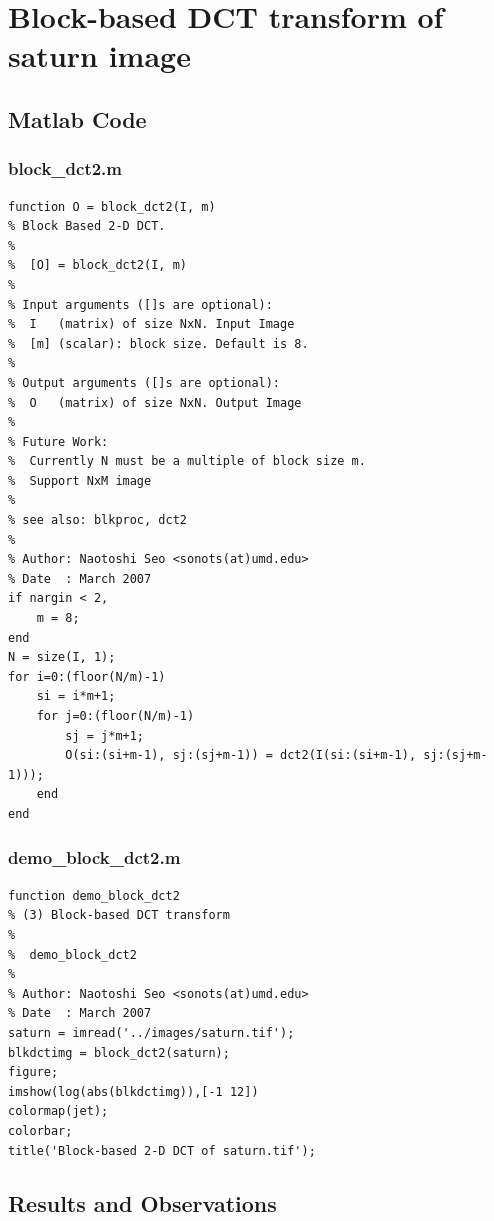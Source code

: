 \documentclass[12pt]{article}
\begin{document}
\section{Block-based DCT transform of saturn image}

\subsection{Matlab Code}

\subsubsection{block\_dct2.m}

\begin{verbatim}
function O = block_dct2(I, m)
% Block Based 2-D DCT.
%
%  [O] = block_dct2(I, m)
%
% Input arguments ([]s are optional):
%  I   (matrix) of size NxN. Input Image
%  [m] (scalar): block size. Default is 8.
%
% Output arguments ([]s are optional):
%  O   (matrix) of size NxN. Output Image
%
% Future Work: 
%  Currently N must be a multiple of block size m. 
%  Support NxM image
%
% see also: blkproc, dct2
%
% Author: Naotoshi Seo <sonots(at)umd.edu>
% Date  : March 2007
if nargin < 2,
    m = 8;
end
N = size(I, 1);
for i=0:(floor(N/m)-1)
    si = i*m+1;
    for j=0:(floor(N/m)-1)
        sj = j*m+1;
        O(si:(si+m-1), sj:(sj+m-1)) = dct2(I(si:(si+m-1), sj:(sj+m-1)));
    end
end
\end{verbatim}

\subsubsection{demo\_block\_dct2.m}

\begin{verbatim}
function demo_block_dct2
% (3) Block-based DCT transform
%
%  demo_block_dct2
%
% Author: Naotoshi Seo <sonots(at)umd.edu>
% Date  : March 2007
saturn = imread('../images/saturn.tif');
blkdctimg = block_dct2(saturn);
figure;
imshow(log(abs(blkdctimg)),[-1 12])
colormap(jet);
colorbar;
title('Block-based 2-D DCT of saturn.tif');
\end{verbatim}

\subsection{Results and Observations}
\end{document}
